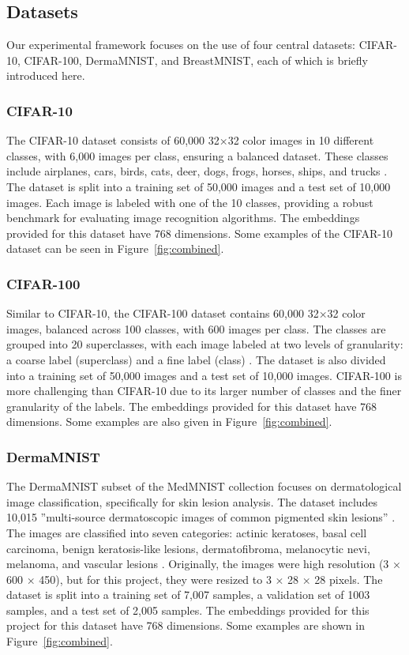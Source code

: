 \documentclass[a4paper]{article}
\begin{document}
\subsection{Datasets}\label{datasets}
Our experimental framework focuses on the use of four central datasets: CIFAR-10, CIFAR-100, DermaMNIST, and BreastMNIST, each of which is briefly introduced here.

\subsubsection{CIFAR-10}\label{cifar10}
The CIFAR-10 dataset consists of 60,000 32×32 color images in 10 different classes, with 6,000 images per class, ensuring a balanced dataset. These classes include airplanes, cars, birds, cats, deer, dogs, frogs, horses, ships, and trucks \citep{Krizhevsky2009}. The dataset is split into a training set of 50,000 images and a test set of 10,000 images. Each image is labeled with one of the 10 classes, providing a robust benchmark for evaluating image recognition algorithms. The embeddings provided for this dataset have 768 dimensions. Some examples of the CIFAR-10 dataset can be seen in Figure~\ref{fig:combined}.

\subsubsection{CIFAR-100}\label{cifar100}
Similar to CIFAR-10, the CIFAR-100 dataset contains 60,000 32×32 color images, balanced across 100 classes, with 600 images per class. The classes are grouped into 20 superclasses, with each image labeled at two levels of granularity: a coarse label (superclass) and a fine label (class) \citep{Krizhevsky2009}. The dataset is also divided into a training set of 50,000 images and a test set of 10,000 images. CIFAR-100 is more challenging than CIFAR-10 due to its larger number of classes and the finer granularity of the labels. The embeddings provided for this dataset have 768 dimensions. Some examples are also given in Figure~\ref{fig:combined}.

\subsubsection{DermaMNIST}\label{dermamnist}
The DermaMNIST subset of the MedMNIST collection focuses on dermatological image classification, specifically for skin lesion analysis. The dataset includes 10,015 ''multi-source dermatoscopic images of common pigmented skin lesions'' \citep{medmnistv1, medmnistv2}. The images are classified into seven categories: actinic keratoses, basal cell carcinoma, benign keratosis-like lesions, dermatofibroma, melanocytic nevi, melanoma, and vascular lesions \citep{DBW86T_2018}. Originally, the images were high resolution (3 × 600 × 450), but for this project, they were resized to 3 × 28 × 28 pixels. The dataset is split into a training set of 7,007 samples, a validation set of 1003 samples, and a test set of 2,005 samples. The embeddings provided for this project for this dataset have 768 dimensions. Some examples are shown in Figure~\ref{fig:combined}.
\end{document}
